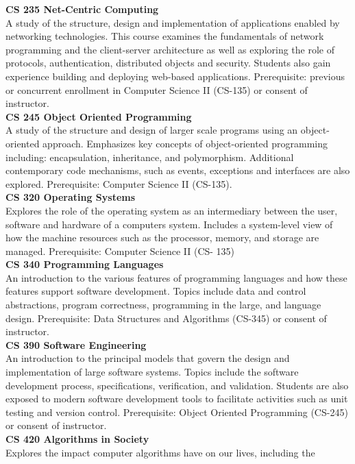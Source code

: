 \documentclass[
  letterpaper,
]{scrbook}
\begin{document}
\textbf{CS 235 Net-Centric Computing}\\
A study of the structure, design and implementation of applications
enabled by networking technologies. This course examines the
fundamentals of network programming and the client-server architecture
as well as exploring the role of protocols, authentication, distributed
objects and security. Students also gain experience building and
deploying web-based applications. Prerequisite: previous or concurrent
enrollment in Computer Science II (CS-135) or consent of instructor.\\
\textbf{CS 245 Object Oriented Programming}\\
A study of the structure and design of larger scale programs using an
object-oriented approach. Emphasizes key concepts of object-oriented
programming including: encapsulation, inheritance, and polymorphism.
Additional contemporary code mechanisms, such as events, exceptions and
interfaces are also explored. Prerequisite: Computer Science II
(CS-135).\\
\textbf{CS 320 Operating Systems}\\
Explores the role of the operating system as an intermediary between the
user, software and hardware of a computers system. Includes a
system-level view of how the machine resources such as the processor,
memory, and storage are managed. Prerequisite: Computer Science II (CS-
135)\\
\textbf{CS 340 Programming Languages}\\
An introduction to the various features of programming languages and how
these features support software development. Topics include data and
control abstractions, program correctness, programming in the large, and
language design. Prerequisite: Data Structures and Algorithms (CS-345)
or consent of instructor.\\
\textbf{CS 390 Software Engineering}\\
An introduction to the principal models that govern the design and
implementation of large software systems. Topics include the software
development process, specifications, verification, and validation.
Students are also exposed to modern software development tools to
facilitate activities such as unit testing and version control.
Prerequisite: Object Oriented Programming (CS-245) or consent of
instructor.\\
\textbf{CS 420 Algorithms in Society}\\
Explores the impact computer algorithms have on our lives, including the
\end{document}
